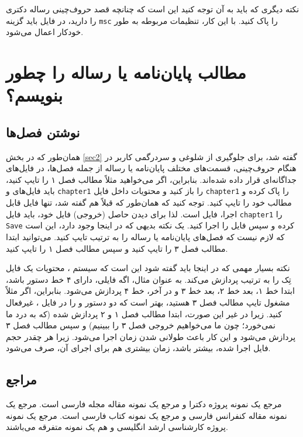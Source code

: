 نکته دیگری که باید به آن توجه کنید این است که چنانچه قصد حروف‌چینی رساله دکتری را دارید، 
 در فایل 
باید گزینه
\verb!msc!
را پاک کنید. با این کار، تنظیمات مربوطه به طور خودکار  اعمال می‌شود.    
\section{مطالب پایان‌نامه یا رساله را چطور بنویسم؟}
\subsection{نوشتن فصل‌ها}
همان‌طور که در بخش \ref{sec2} گفته شد، برای جلوگیری از شلوغی و سردرگمی کاربر در هنگام حروف‌چینی، قسمت‌های مختلف پایان‌نامه یا رساله از جمله فصل‌ها، در فایل‌های جداگانه‌ای قرار داده شده‌اند. 
بنابراین، اگر می‌خواهید مثلاً مطالب فصل ۱ را تایپ کنید، باید فایل‌های 
و
\verb!chapter1!
را باز کنید و محتویات داخل فایل 
\verb!chapter1!
را پاک کرده و مطالب خود را تایپ کنید. توجه کنید که همان‌طور که قبلاً هم گفته شد، تنها فایل قابل اجرا، فایل 
است. لذا برای دیدن حاصل (خروجی) فایل خود، باید فایل  
\verb!chapter1!
را 
\verb!Save!
کرده و سپس فایل 
را اجرا کنید. یک نکته بدیهی که در اینجا وجود دارد، این است که لازم نیست که فصل‌های پایان‌نامه یا رساله را به ترتیب تایپ کنید. می‌توانید ابتدا مطالب فصل ۳ را تایپ کنید و سپس مطالب فصل ۱ را تایپ کنید. 

نکته بسیار مهمی که در اینجا باید گفته شود این است که سیستم \lr{\TeX}، محتویات یک فایل تِک را به ترتیب پردازش می‌کند. به عنوان مثال، اگه فایلی، دارای ۴ خط دستور باشد، ابتدا خط ۱، بعد خط ۲، بعد خط ۳ و در آخر، خط ۴ پردازش می‌شود. بنابراین، اگر مثلاً مشغول تایپ مطالب فصل ۳ هستید، بهتر است
که دو دستور 
\verb!!
و
\verb!!
را در فایل 
،
غیرفعال%
 کنید. زیرا در غیر این صورت، ابتدا مطالب فصل ۱ و ۲ پردازش شده (که به درد ما نمی‌خورد؛ چون ما می‌خواهیم خروجی فصل ۳ را ببینیم) و سپس مطالب فصل ۳ پردازش می‌شود و این کار باعث طولانی شدن زمان اجرا می‌شود. زیرا هر چقدر حجم فایل اجرا شده، بیشتر باشد، زمان بیشتری هم برای اجرای آن، صرف می‌شود.
\subsection{مراجع}
مرجع \cite{Omidali82phdThesis} یک نمونه پروژه دکترا و مرجع \cite{Vahedi87} یک نمونه مقاله مجله فارسی است.
مرجع \cite{Amintoosi87afzayesh}  یک نمونه  مقاله کنفرانس فارسی و
مرجع \cite{vahid90} یک نمونه کتاب فارسی است. مرجع \cite{Khalighi07MscThesis} یک نمونه پروژه کارشناسی ارشد انگلیسی و
\cite{Khalighi87xepersian} هم یک نمونه متفرقه  می‌باشند.

